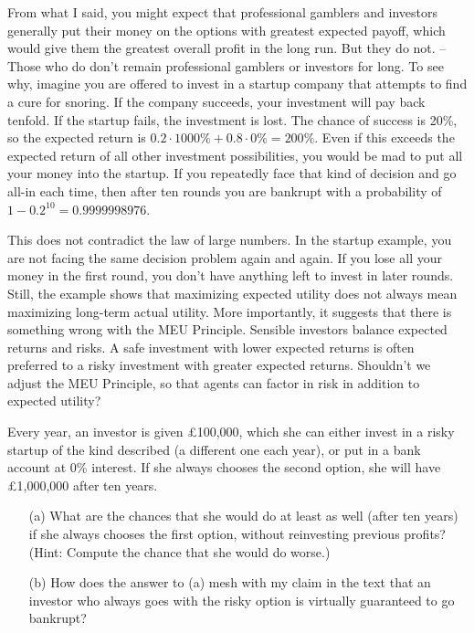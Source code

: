 
From what I said, you might expect that professional gamblers and investors
generally put their money on the options with greatest expected payoff, which
would give them the greatest overall profit in the long run. But they do not. --
Those who do don't remain professional gamblers or investors for long. To see
why, imagine you are offered to invest in a startup company that attempts to
find a cure for snoring. If the company succeeds, your investment will pay back
tenfold. If the startup fails, the investment is lost. The chance of success is
20\%, so the expected return is $0.2 \cdot 1000\% + 0.8 \cdot 0\% = 200\%$. Even
if this exceeds the expected return of all other investment possibilities, you
would be mad to put all your money into the startup. If you repeatedly face that
kind of decision and go all-in each time, then after ten rounds you are bankrupt
with a probability of $1-0.2^{10} = 0.9999998976$.%

This does not contradict the law of large numbers. In the startup
example, you are not facing the same decision problem again and
again. If you lose all your money in the first round, you don't have
anything left to invest in later rounds. Still, the example shows that
maximizing expected utility does not always mean maximizing long-term
actual utility. More importantly, it suggests that there is something
wrong with the MEU Principle. Sensible investors balance expected
returns and risks. A safe investment with lower expected returns is
often preferred to a risky investment with greater expected returns.
Shouldn't we adjust the MEU Principle, so that agents can factor in
risk in addition to expected utility?

\begin{exercise}{2}
  Every year, an investor is given £100,000, which she can either invest
  in a risky startup of the kind described (a different one
  each year), or put in a bank account at 0\% interest. If she always
  chooses the second option, she will have £1,000,000 after ten years.
  \begin{enumerate}
  \item[(a)] What are the chances that she would do at least as well
    (after ten years) if she always chooses the first option, without
    reinvesting previous profits? (Hint: Compute the chance that she
    would do worse.)
  \item[(b)] How does the answer to (a) mesh with my claim in the text
    that an investor who always goes with the risky option is
    virtually guaranteed to go bankrupt?
  \end{enumerate}
\end{exercise}

